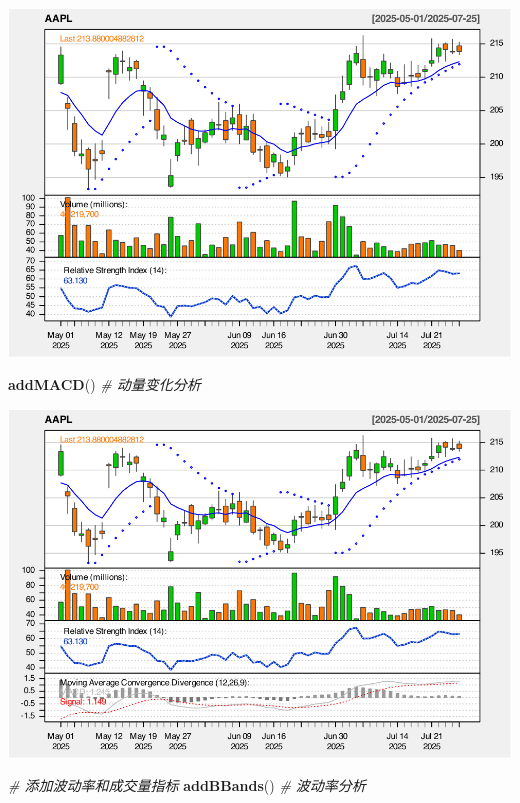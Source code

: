 \documentclass[]{ctexbook}
\newenvironment{Shaded}{\begin{snugshade}}{\end{snugshade}}
\newcommand{\CommentTok}[1]{\textcolor[rgb]{0.56,0.35,0.01}{\textit{#1}}}
\newcommand{\FunctionTok}[1]{\textcolor[rgb]{0.13,0.29,0.53}{\textbf{#1}}}
\newcommand{\NormalTok}[1]{#1}
\begin{document}
\includegraphics[width=0.9\linewidth]{QuantmodHandbook_files/figure-latex/comprehensive-5}

\begin{Shaded}
\begin{Highlighting}[]
\FunctionTok{addMACD}\NormalTok{()  }\CommentTok{\# 动量变化分析}
\end{Highlighting}
\end{Shaded}

\includegraphics[width=0.9\linewidth]{QuantmodHandbook_files/figure-latex/comprehensive-6}

\begin{Shaded}
\begin{Highlighting}[]
\CommentTok{\# 添加波动率和成交量指标}
\FunctionTok{addBBands}\NormalTok{()  }\CommentTok{\# 波动率分析}
\end{Highlighting}
\end{Shaded}
\end{document}
